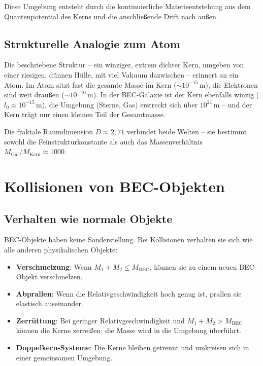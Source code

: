 \documentclass[12pt,a4paper]{article}
\begin{document}
Diese Umgebung entsteht durch die kontinuierliche Materieentstehung aus dem Quantenpotential des Kerns und die anschließende Drift nach außen.

\subsection{Strukturelle Analogie zum Atom}

Die beschriebene Struktur – ein winziger, extrem dichter Kern, umgeben von einer riesigen, dünnen Hülle, mit viel Vakuum dazwischen – erinnert an ein Atom. Im Atom sitzt fast die gesamte Masse im Kern ($\sim 10^{-15}\,\text{m}$), die Elektronen sind weit draußen ($\sim 10^{-10}\,\text{m}$). In der BEC-Galaxie ist der Kern ebenfalls winzig ($l_0 \approx 10^{-15}\,\text{m}$), die Umgebung (Sterne, Gas) erstreckt sich über $10^{21}\,\text{m}$ – und der Kern trägt nur einen kleinen Teil der Gesamtmasse.

Die fraktale Raumdimension $D \approx 2{,}71$ verbindet beide Welten – sie bestimmt sowohl die Feinstrukturkonstante als auch das Massenverhältnis $M_{\text{Gal}}/M_{\text{Kern}} \approx 1000$.

\section{Kollisionen von BEC-Objekten}

\subsection{Verhalten wie normale Objekte}

BEC-Objekte haben keine Sonderstellung. Bei Kollisionen verhalten sie sich wie alle anderen physikalischen Objekte:

\begin{itemize}
\item \textbf{Verschmelzung}: Wenn $M_1 + M_2 \leq M_{\text{BEC}}$, können sie zu einem neuen BEC-Objekt verschmelzen.
\item \textbf{Abprallen}: Wenn die Relativgeschwindigkeit hoch genug ist, prallen sie elastisch auseinander.
\item \textbf{Zerrüttung}: Bei geringer Relativgeschwindigkeit und $M_1 + M_2 > M_{\text{BEC}}$ können die Kerne zerreißen; die Masse wird in die Umgebung überführt.
\item \textbf{Doppelkern-Systeme}: Die Kerne bleiben getrennt und umkreisen sich in einer gemeinsamen Umgebung.
\end{itemize}
\end{document}
